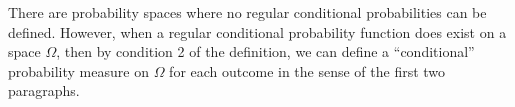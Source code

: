 \documentclass[12pt]{article}
\begin{document}
There are probability spaces where no regular conditional probabilities can be defined.  However, when a regular conditional probability function does exist on a space $\Omega$, then by condition 2 of the definition, we can define a ``conditional'' probability measure on $\Omega$ for each outcome in the sense of the first two paragraphs.
\end{document}

